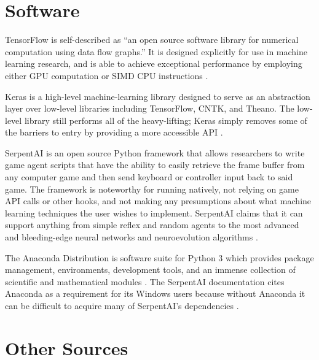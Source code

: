 


\section{Software}

TensorFlow is self-described as ``an open source software library for numerical computation using data flow graphs.'' It is designed explicitly for use in machine learning research, and is able to achieve exceptional performance by employing either GPU computation or SIMD CPU instructions \cite{TensorFlow}.

Keras is a high-level machine-learning library designed to serve as an abstraction layer over low-level libraries including TensorFlow, CNTK, and Theano. The low-level library still performs all of the heavy-lifting; Keras simply removes some of the barriers to entry by providing a more accessible API \cite{Keras}.

SerpentAI is an open source Python framework that allows researchers to write game agent scripts that have the ability to easily retrieve the frame buffer from any computer game and then send keyboard or controller input back to said game. The framework is noteworthy for running natively, not relying on game API calls or other hooks, and not making any presumptions about what machine learning techniques the user wishes to implement. SerpentAI claims that it can support anything from simple reflex and random agents to the most advanced and bleeding-edge neural networks and neuroevolution algorithms \cite{SerpentAI}.

The Anaconda Distribution is software suite for Python 3 which provides package management, environments, development tools, and an immense collection of scientific and mathematical modules \cite{Anaconda}. The SerpentAI documentation cites Anaconda as a requirement for its Windows users because without Anaconda it can be difficult to acquire many of SerpentAI's dependencies \cite{SerpentAI}.




\section{Other Sources}

